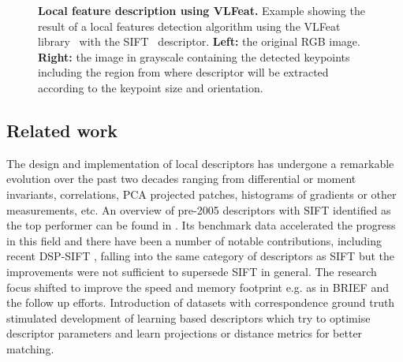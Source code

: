 \begin{figure}
    \centering
    \qquad
    \caption[Local feature description using VLFeat]{\textbf{Local feature description using VLFeat.} Example showing the result of a local features detection algorithm using the VLFeat library~\cite{vedaldi08vlfeat} with the SIFT~\cite{SIFT} descriptor. \textbf{Left:} the original RGB image. \textbf{Right:} the image in grayscale containing the detected keypoints including the region from where descriptor will be extracted according to the keypoint size and orientation.}
    \label{tfeat_fig:feature_description_example}
\end{figure}

\subsection{Related work}
The design and implementation of local descriptors has undergone a
remarkable evolution over the past two decades ranging from
differential or moment invariants, correlations, PCA projected patches, histograms of
gradients or other measurements, etc. An
overview of  pre-2005 descriptors with SIFT
\cite{Lowe:2004:DIF:993451.996342} identified as the top performer can
be found in \cite{schmid2003performance}. 
Its benchmark data accelerated the progress in this field and there
have been a number of notable contributions, including recent DSP-SIFT
\cite{DBLP:journals/corr/DongS14}, falling into the same category of
descriptors as SIFT but the improvements were not sufficient to
supersede SIFT in general. The research focus shifted to
improve the speed and memory footprint e.g. as in BRIEF
\cite{Calonder:2010:BBR:1888089.1888148} and the follow up efforts.
Introduction of datasets with correspondence ground truth \cite{WHB09}
stimulated development of learning based descriptors which try to
optimise descriptor parameters and learn projections or distance
metrics \cite{BHW10,simonyan2014learning} for better matching. 

